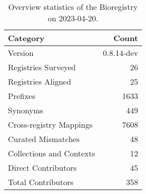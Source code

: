 \begin{table}
\caption{Overview statistics of the Bioregistry on 2023-04-20.}
\label{tab:bioregistry-summary}
\begin{tabular}{lr}
\toprule
Category & Count \\
\midrule
Version & 0.8.14-dev \\
Registries Surveyed & 26 \\
Registries Aligned & 25 \\
Prefixes & 1633 \\
Synonyms & 449 \\
Cross-registry Mappings & 7608 \\
Curated Mismatches & 48 \\
Collections and Contexts & 12 \\
Direct Contributors & 45 \\
Total Contributors & 358 \\
\bottomrule
\end{tabular}
\end{table}
